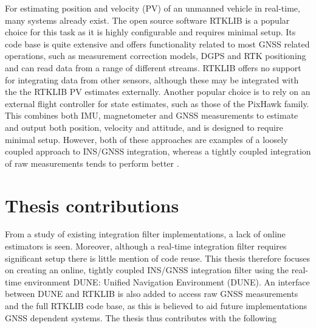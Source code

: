 For estimating position and velocity (PV) of an unmanned vehicle in real-time, many systems already exist. The open source software RTKLIB is a popular choice for this task as it is highly configurable and requires minimal setup. Its code base is quite extensive and offers functionality related to most GNSS related operations, such as measurement correction models, DGPS and RTK positioning and can read data from a range of different streams. RTKLIB offers no support for integrating data from other sensors, although these may be integrated with the the RTKLIB PV estimates externally. Another popular choice is to rely on an external flight controller for state estimates, such as those of the PixHawk family. This combines both IMU, magnetometer and GNSS measurements to estimate and output both position, velocity and attitude, and is designed to require minimal setup. However, both of these approaches are examples of a loosely coupled approach to INS/GNSS integration, whereas a tightly coupled integration of raw measurements tends to perform better \cite{farrell2008aided, groves2013principles}.\\

\section{Thesis contributions}
 From a study of existing integration filter implementations, a lack of online estimators is seen. Moreover, although a real-time integration filter requires significant setup there is little mention of code reuse. This thesis therefore focuses on creating an online, tightly coupled INS/GNSS integration filter using the real-time environment DUNE: Unified Navigation Environment (DUNE). An interface between DUNE and RTKLIB is also added to access raw GNSS measurements and the full RTKLIB code base, as this is believed to aid future implementations GNSS dependent systems. The thesis thus contributes with the following\\


